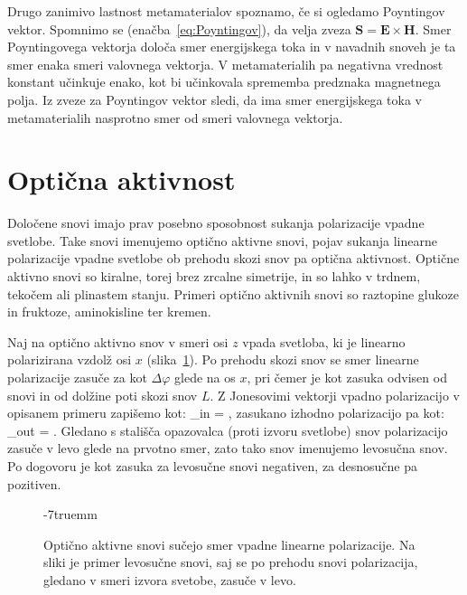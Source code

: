 Drugo zanimivo lastnost  metamaterialov spoznamo, če si ogledamo Poyntingov vektor. 
Spomnimo se (enačba~\ref{eq:Poyntingov}), da velja zveza 
$\mathbf{S} = \mathbf{E}\times \mathbf{H}$. Smer Poyntingovega vektorja določa smer
energijskega toka in v navadnih snoveh je ta smer enaka smeri valovnega vektorja.
V metamaterialih pa negativna vrednost konstant učinkuje enako, kot bi učinkovala
sprememba predznaka magnetnega polja. Iz zveze za Poyntingov vektor sledi, da ima
smer energijskega toka v metamaterialih nasprotno smer od smeri valovnega vektorja. 

\section{Optična aktivnost}
Določene snovi imajo prav posebno sposobnost sukanja polarizacije vpadne svetlobe.
Take snovi imenujemo optično aktivne snovi, pojav sukanja linearne polarizacije
vpadne svetlobe ob prehodu skozi snov pa optična aktivnost.
Optične aktivno snovi so kiralne, torej brez zrcalne simetrije, in so lahko
v trdnem, tekočem ali plinastem stanju. Primeri optično aktivnih snovi
so raztopine glukoze in fruktoze, aminokisline ter kremen.

Naj na optično aktivno snov v smeri osi $z$ 
vpada svetloba, ki je linearno polarizirana vzdolž osi $x$ 
(slika~\ref{fig:09_aktivnost}). Po 
prehodu skozi snov se smer linearne polarizacije
zasuče za kot $\Delta \varphi$ glede na os $x$, pri čemer je kot zasuka 
odvisen od snovi in od dolžine poti skozi snov $L$. Z Jonesovimi
vektorji vpadno polarizacijo v opisanem primeru zapišemo kot:
\beq
{}_{in} = 
\left[\begin{array}{c}
1\\
0\\
\end{array}\right]\!\!,
\label{eq:09_40}
\eeq
zasukano izhodno polarizacijo pa kot:
\beq
{}_{out} = 
\!\!.
\label{eq:09_41}
\eeq
Gledano s stališča opazovalca (proti izvoru svetlobe)
snov polarizacijo zasuče v levo glede na prvotno smer, zato tako snov imenujemo
levosučna snov. Po dogovoru je kot zasuka za levosučne snovi negativen, za
desnosučne pa pozitiven.
\begin{figure}[h]
\centering
\def\svgwidth{100truemm} 

\caption{Optično aktivne snovi sučejo smer vpadne linearne polarizacije. Na sliki
je primer levosučne snovi, saj se po prehodu snovi polarizacija, gledano v smeri 
izvora svetobe, zasuče v levo.}
\label{fig:09_aktivnost}
\vglue-7truemm
\end{figure}
 
